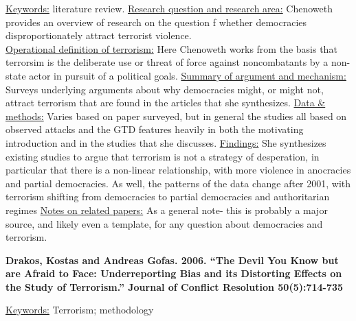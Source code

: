 \documentclass{article}[12pt]
\begin{document}
\underline{Keywords:} literature review.
\underline{Research question and research area:} Chenoweth provides an overview of research on the question f whether democracies disproportionately attract terrorist violence. \\
\underline{Operational definition of terrorism:} Here Chenoweth works from the basis that terrorsim is the deliberate use or threat of force against noncombatants by a non-state actor in pursuit of a political goals.
\underline{Summary of argument and mechanism:} Surveys underlying arguments about why democracies might, or might not, attract terrorism that are found in the articles that she synthesizes. 
\underline{Data \& methods:} Varies based on paper surveyed, but in general the studies all based on observed attacks and the GTD features heavily in both the motivating introduction and in the studies that she discusses. 
\underline{Findings:} She synthesizes existing studies to argue that terrorism is not a strategy of desperation, in particular that there is a non-linear relationship, with more violence in anocracies and partial democracies. As well, the patterns of the data change after 2001, with terrorism shifting from democracies to partial democracies and authoritarian regimes
\underline{Notes on related papers:} As a general note- this is probably a major source, and likely even a template, for any question about democracies and terrorism.

\textbf{Drakos, Kostas and Andreas Gofas. 2006. “The Devil You Know but are Afraid to Face:
Underreporting Bias and its Distorting Effects on the Study of Terrorism.” Journal of Conflict Resolution 50(5):714-735}


\underline{Keywords:} Terrorism; methodology
\end{document}
